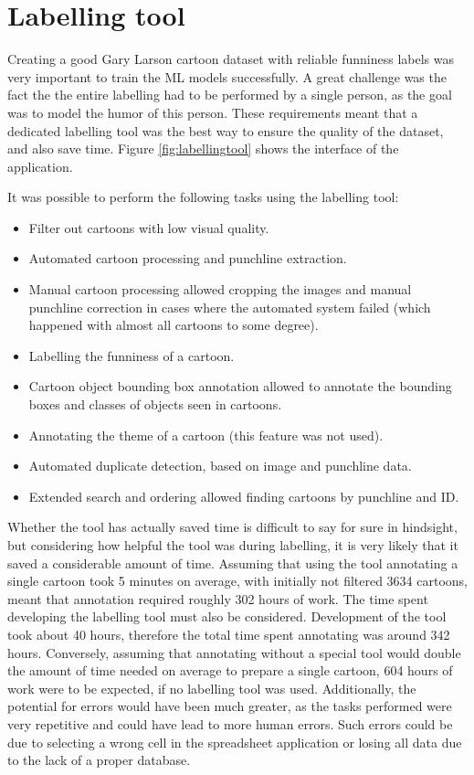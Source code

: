 \documentclass[draft,final,oneside]{vutinfth} %
\begin{document}
\fi

\section{Labelling tool}

Creating a good Gary Larson cartoon dataset with reliable funniness labels was very important to train the ML models successfully. A great challenge was the fact the the entire labelling had to be performed by a single person, as the goal was to model the humor of this person. These requirements meant that a dedicated labelling tool was the best way to ensure the quality of the dataset, and also save time. Figure \ref{fig:labellingtool} shows the interface of the application.

It was possible to perform the following tasks using the labelling tool:
\begin{itemize}
\item Filter out cartoons with low visual quality.
\item Automated cartoon processing and punchline extraction.
\item Manual cartoon processing allowed cropping the images and manual punchline correction in cases where the automated system failed (which happened with almost all cartoons to some degree).
\item  Labelling the funniness of a cartoon.
\item Cartoon object bounding box annotation allowed to annotate the bounding boxes and classes of objects seen in cartoons.
\item Annotating the theme of a cartoon (this feature was not used).
\item Automated duplicate detection, based on image and punchline data.
\item Extended search and ordering allowed finding cartoons by punchline and ID.
\end{itemize}

Whether the tool has actually saved time is difficult to say for sure in hindsight, but considering how helpful the tool was during labelling, it is very likely that it saved a considerable amount of time. Assuming that using the tool annotating a single cartoon took 5 minutes on average, with initially not filtered 3634 cartoons, meant that annotation required roughly 302 hours of work. The time spent developing the labelling tool must also be considered. Development of the tool took about 40 hours, therefore the total time spent annotating was around 342 hours. Conversely, assuming that annotating without a special tool would double the amount of time needed on average to prepare a single cartoon, 604 hours of work were to be expected, if no labelling tool was used. Additionally, the potential for errors would have been much greater, as the tasks performed were very repetitive and could have lead to more human errors. Such errors could be due to selecting a wrong cell in the spreadsheet application or losing all data due to the lack of a proper database.
\end{document}
